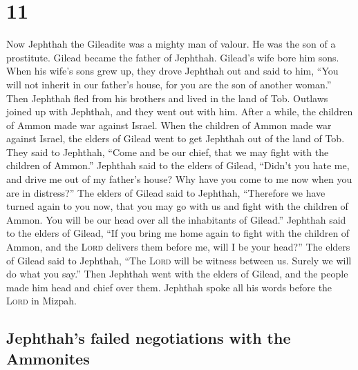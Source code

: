 \hypertarget{section-10}{%
\section{11}\label{section-10}}

 Now Jephthah the Gileadite was a mighty man of valour. He
was the son of a prostitute. Gilead became the father of Jephthah.
 Gilead's wife bore him sons. When his wife's sons grew
up, they drove Jephthah out and said to him, ``You will not inherit in
our father's house, for you are the son of another woman.''
 Then Jephthah fled from his brothers and lived in the
land of Tob. Outlaws joined up with Jephthah, and they went out with
him.  After a while, the children of Ammon made war
against Israel.  When the children of Ammon made war
against Israel, the elders of Gilead went to get Jephthah out of the
land of Tob.  They said to Jephthah, ``Come and be our
chief, that we may fight with the children of Ammon.'' 
Jephthah said to the elders of Gilead, ``Didn't you hate me, and drive
me out of my father's house? Why have you come to me now when you are in
distress?''  The elders of Gilead said to Jephthah,
``Therefore we have turned again to you now, that you may go with us and
fight with the children of Ammon. You will be our head over all the
inhabitants of Gilead.''  Jephthah said to the elders of
Gilead, ``If you bring me home again to fight with the children of
Ammon, and the \textsc{Lord} delivers them before me, will I be your
head?''  The elders of Gilead said to Jephthah, ``The
\textsc{Lord} will be witness between us. Surely we will do what you
say.''  Then Jephthah went with the elders of Gilead, and
the people made him head and chief over them. Jephthah spoke all his
words before the \textsc{Lord} in Mizpah.

\hypertarget{jephthahs-failed-negotiations-with-the-ammonites}{%
\subsection{Jephthah's failed negotiations with the
Ammonites}\label{jephthahs-failed-negotiations-with-the-ammonites}}


